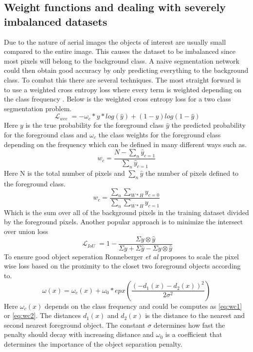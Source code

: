 \documentclass[a4paper,11pt]{article}
\DeclareMathOperator{\Lagr}{\mathcal{L}}
\begin{document}
\subsection{Weight functions and dealing with severely imbalanced datasets}
Due to the nature of aerial images the objects of interest are usually small compared to the entire image. This causes the dataset to be imbalanced since most pixels will belong to the background class. A naive segmentation network could then obtain good accuracy by only predicting everything to the background class. To combat this there are several techniques. The most straight forward is to use a weighted cross entropy loss where every term is weighted depending on the class frequency \cite{sudre_generalised_2017}. Below is the weighted cross entropy loss for a two class segmentation problem.
\begin{equation}
\Lagr_{wce}=-\omega_c*y*log(\hat{y}) + (1-y)log(1-\hat{y})
\end{equation}
Here $y$ is the true probability for the foreground class  $\hat{y}$ the predicted probability for the foreground class and $\omega_c$ the class weights for the foreground class depending on the frequency which can be defined in many different ways such as. 
\begin{equation}\label{eq:wc1}
w_c=\frac{N - \sum_{n}{} \hat{y}_{c=1}}{\sum_{n} \hat{y}_{c=1}}
\end{equation}
Here N is the total number of pixels and $\sum_{n}{} \hat{y}$ the number of pixels defined to the foreground class. 
\begin{equation}\label{eq:wc2}
w_c=\frac{\sum_{n}{} \sum_{W*H} y_{c=0}}{\sum_{n} \sum_{W*H} y_{c=1}}
\end{equation}
Which is the sum over all of the background pixels in the training dataset divided by the foreground pixels.
Another popular approach is to minimize the intersect over union loss \cite{yu_unitbox:_2016, rahman_optimizing_2016}
\begin{equation}
\Lagr_{IoU}= 1 - \frac{ \Sigma y \otimes \hat{y} }{ \Sigma y + \Sigma \hat{y} - \Sigma y \otimes \hat{y}}
\end{equation}
To ensure good object seperation Ronneberger \textit{et al} \cite{ronneberger_u-net:_2015} proposes to scale the pixel wise loss based on the proximity to the closet two foreground objects according to.
\begin{equation}
\omega(x)=\omega_c(x)+\omega_0*epx(\frac{(-d_1(x)-d_2(x))^{2}}{2\sigma^2})
\end{equation}
Here $\omega_c(x)$ depends on the class frequency and could be computes as \ref{eq:wc1} or \ref{eq:wc2}. The distances $d_1(x)$ and $d_2(x)$ is the distance to the nearest and second nearest foreground object. The constant $\sigma$ determines how fast the penalty should decay with increasing distance and $\omega_0$ is a coefficient that determines the importance of the object separation penalty.
\end{document}
